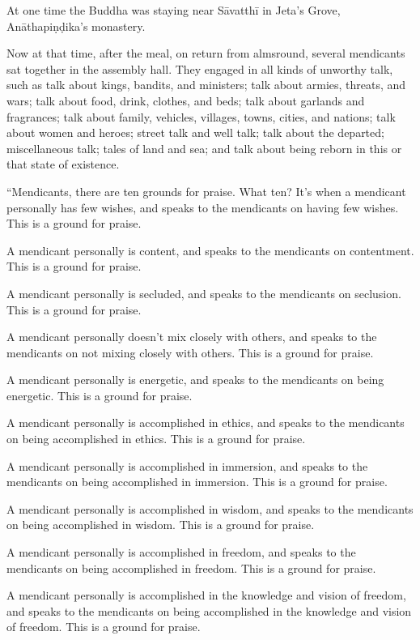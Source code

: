 \documentclass[12pt,openany]{book}%
\begin{document}
At one time the Buddha was staying near \textsanskrit{Sāvatthī} in Jeta’s Grove, \textsanskrit{Anāthapiṇḍika}’s monastery. 

Now at that time, after the meal, on return from almsround, several mendicants sat together in the assembly hall. They engaged in all kinds of unworthy talk, such as talk about kings, bandits, and ministers; talk about armies, threats, and wars; talk about food, drink, clothes, and beds; talk about garlands and fragrances; talk about family, vehicles, villages, towns, cities, and nations; talk about women and heroes; street talk and well talk; talk about the departed; miscellaneous talk; tales of land and sea; and talk about being reborn in this or that state of existence. 

“Mendicants, there are ten grounds for praise. What ten? It’s when a mendicant personally has few wishes, and speaks to the mendicants on having few wishes. This is a ground for praise. 

A mendicant personally is content, and speaks to the mendicants on contentment. This is a ground for praise. 

A mendicant personally is secluded, and speaks to the mendicants on seclusion. This is a ground for praise. 

A mendicant personally doesn’t mix closely with others, and speaks to the mendicants on not mixing closely with others. This is a ground for praise. 

A mendicant personally is energetic, and speaks to the mendicants on being energetic. This is a ground for praise. 

A mendicant personally is accomplished in ethics, and speaks to the mendicants on being accomplished in ethics. This is a ground for praise. 

A mendicant personally is accomplished in immersion, and speaks to the mendicants on being accomplished in immersion. This is a ground for praise. 

A mendicant personally is accomplished in wisdom, and speaks to the mendicants on being accomplished in wisdom. This is a ground for praise. 

A mendicant personally is accomplished in freedom, and speaks to the mendicants on being accomplished in freedom. This is a ground for praise. 

A mendicant personally is accomplished in the knowledge and vision of freedom, and speaks to the mendicants on being accomplished in the knowledge and vision of freedom. This is a ground for praise. 
\end{document}

